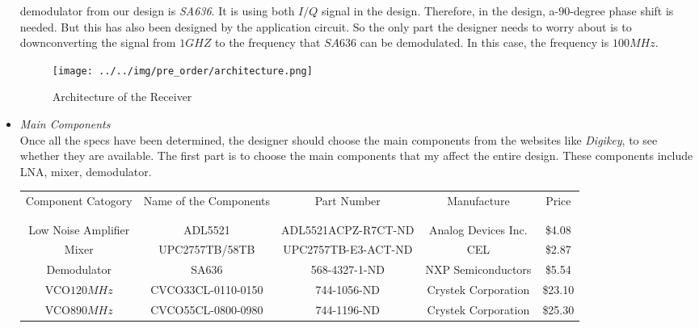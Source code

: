 \documentclass[]{article}
\begin{document}
\begin{itemize}
            demodulator from our design is \textit{SA636}. It is using both
            $I/Q$ signal in the design. Therefore, in the design, a-$90$-degree
            phase shift is needed. But this has also been designed by the
            application circuit. So the only part the designer needs to worry
            about is to downconverting the signal from $1GHZ$ to the frequency
            that $SA636$ can be demodulated. In this case, the frequency is
            $100MHz$.
            \begin{figure}[p]
                \begin{center}
                    \texttt{[image: ../../img/pre\_order/architecture.png]}~
                    \label{architecture}
                    \caption{Architecture of the Receiver}
                \end{center}
            \end{figure}
        \item \textit{Main Components} \\
            Once all the specs have been determined, the designer should choose
            the main components from the websites like \textit{Digikey}, to see
            whether they are available. The first part is to choose the main
            components that my affect the entire design. These components
            include LNA, mixer, demodulator.

            \begin{center}
                \begin{tabular}{c c c c c}
                    Component Catogory & Name of the Components & Part Number &
                    Manufacture & Price \\ \\ \hline \\
                    Low Noise Amplifier & ADL5521 & ADL5521ACPZ-R7CT-ND & Analog Devices Inc.
                    & \$4.08 \\
                    Mixer & UPC2757TB/58TB & UPC2757TB-E3-ACT-ND & CEL & \$2.87 \\
                    Demodulator & SA636 & 568-4327-1-ND & NXP Semiconductors &
                    \$5.54\\
                    VCO\(120MHz\) & CVCO33CL-0110-0150 & 744-1056-ND & Crystek
                    Corporation & \$23.10 \\
                    VCO\(890MHz\) & CVCO55CL-0800-0980 & 744-1196-ND & Crystek
                    Corporation & \$25.30 \\
                \end{tabular}
            \end{center}


\end{itemize}
\end{document}
